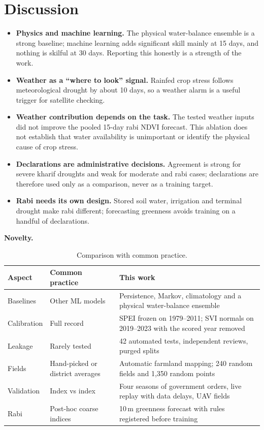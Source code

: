 \documentclass[11pt,a4paper,oneside]{article}
\begin{document}
\section{Discussion}
\begin{itemize}
\item \textbf{Physics and machine learning.} The physical water-balance ensemble is a strong baseline; machine learning adds significant skill mainly at 15 days, and nothing is skilful at 30 days. Reporting this honestly is a strength of the work.
\item \textbf{Weather as a ``where to look'' signal.} Rainfed crop stress follows meteorological drought by about 10 days, so a weather alarm is a useful trigger for satellite checking.
\item \textbf{Weather contribution depends on the task.} The tested weather inputs did not improve the pooled 15-day rabi NDVI forecast. This ablation does not establish that water availability is unimportant or identify the physical cause of crop stress.
\item \textbf{Declarations are administrative decisions.} Agreement is strong for severe kharif droughts and weak for moderate and rabi cases; declarations are therefore used only as a comparison, never as a training target.
\item \textbf{Rabi needs its own design.} Stored soil water, irrigation and terminal drought make rabi different; forecasting greenness avoids training on a handful of declarations.
\end{itemize}

\textbf{Novelty.}
\begin{table}[H]
\centering
\caption{Comparison with common practice.}
\label{tab:novelty}
\footnotesize
\begin{tabularx}{\textwidth}{@{}p{2.4cm}p{4.2cm}Y@{}}
\toprule
\textbf{Aspect} & \textbf{Common practice} & \textbf{This work} \\
\midrule
Baselines & Other ML models & Persistence, Markov, climatology and a physical water-balance ensemble \\
Calibration & Full record & SPEI frozen on 1979--2011; SVI normals on 2019--2023 with the scored year removed \\
Leakage & Rarely tested & 42 automated tests, independent reviews, purged splits \\
Fields & Hand-picked or district averages & Automatic farmland mapping; 240 random fields and 1,350 random points \\
Validation & Index vs index & Four seasons of government orders, live replay with data delays, UAV fields \\
Rabi & Post-hoc coarse indices & 10\,m greenness forecast with rules registered before training \\
\bottomrule
\end{tabularx}
\end{table}
\end{document}
